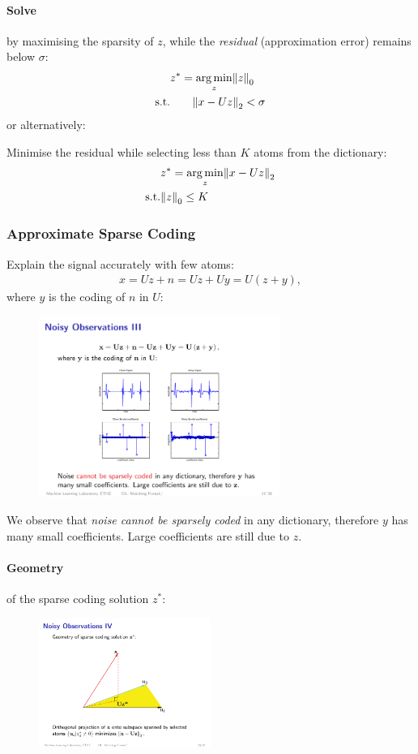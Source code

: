 \paragraph{Solve} by maximising the sparsity of $z$, while the \emph{residual} (approximation error) remains below $\sigma$:
\begin{align*}
     &z^*  = \argmin_{z} \norm{z}_0\\
     \text{s.t.}&\qquad \norm{x-Uz}_2 < \sigma
\end{align*}
or alternatively:

Minimise the residual while selecting less than $K$ atoms from the dictionary:
\begin{align*}
    &z^* = \argmin_z \norm{x-Uz}_2\\
    \text{s.t.}&\norm{z}_0 \leq K
\end{align*}

\subsubsection{Approximate Sparse Coding}
Explain the signal accurately with few atoms:
\begin{align*}
    x =Uz + n = Uz+Uy = U(z+y),    
\end{align*}
where $y$ is the coding of $n$ in $U$:
\begin{figure}[H]
    \centering
    \includegraphics[width=0.7\textwidth]{img/09_noise_vs_signal}
\end{figure}
We observe that \emph{noise cannot be sparsely coded} in any dictionary, therefore $y$ has many small coefficients. Large coefficients are still due to $z$.

\paragraph{Geometry} of the sparse coding solution $z^*$:
\begin{figure}[H]
\centering
\includegraphics[width=0.5\textwidth]{img/09_geometry}
\end{figure}

